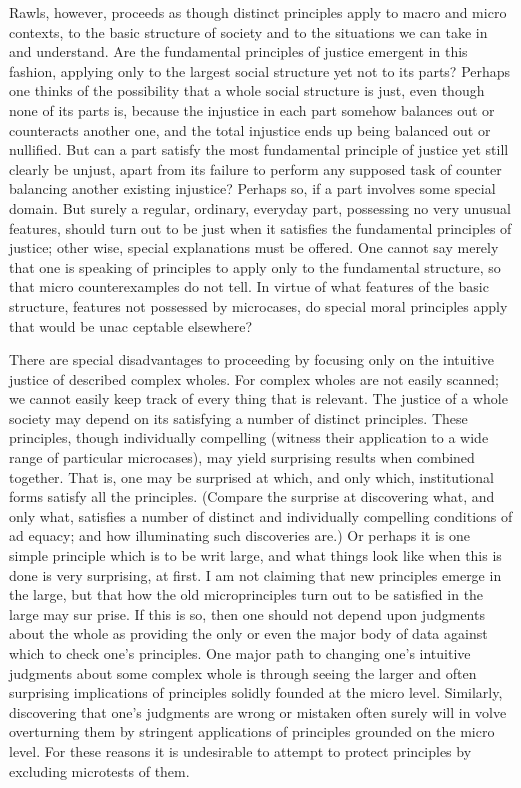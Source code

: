 \documentclass[11pt,openany]{book}
\begin{document}
Rawls, however, proceeds as though distinct principles apply to macro and micro contexts, to the basic structure of society and to the situations we can take in and understand. Are the fundamental principles of justice emergent in this fashion, applying only to the largest social structure yet not to its parts? Perhaps one thinks of the possibility that a whole social structure is just, even though none of its parts is, because the injustice in each part somehow balances out or counteracts another one, and the total injustice ends up being balanced out or nullified. But can a part satisfy the most fundamental principle of justice yet still clearly be unjust, apart from its failure to perform any supposed task of counter balancing another existing injustice? Perhaps so, if a part involves some special domain. But surely a regular, ordinary, everyday part, possessing no very unusual features, should turn out to be just when it satisfies the fundamental principles of justice; other wise, special explanations must be offered. One cannot say merely that one is speaking of principles to apply only to the fundamental structure, so that micro counterexamples do not tell. In virtue of what features of the basic structure, features not possessed by microcases, do special moral principles apply that would be unac ceptable elsewhere? 

There are special disadvantages to proceeding by focusing only on the intuitive justice of described complex wholes. For complex wholes are not easily scanned; we cannot easily keep track of every thing that is relevant. The justice of a whole society may depend on its satisfying a number of distinct principles. These principles, though individually compelling (witness their application to a wide range of particular microcases), may yield surprising results when combined together. That is, one may be surprised at which, and only which, institutional forms satisfy all the principles. (Compare the surprise at discovering what, and only what, satisfies a number of distinct and individually compelling conditions of ad equacy; and how illuminating such discoveries are.) Or perhaps it is one simple principle which is to be writ large, and what things look like when this is done is very surprising, at first. I am not claiming that new principles emerge in the large, but that how the old microprinciples turn out to be satisfied in the large may sur prise. If this is so, then one should not depend upon judgments about the whole as providing the only or even the major body of data against which to check one's principles. One major path to changing one's intuitive judgments about some complex whole is through seeing the larger and often surprising implications of principles solidly founded at the micro level. Similarly, discovering that one's judgments are wrong or mistaken often surely will in volve overturning them by stringent applications of principles grounded on the micro level. For these reasons it is undesirable to attempt to protect principles by excluding microtests of them. 
\end{document}

